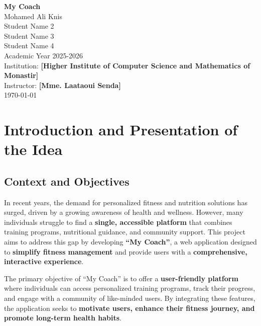 \documentclass[12pt,a4paper]{report}
\begin{document}
\begin{titlepage}
    \centering
    \vspace*{1cm}
    {\fontsize{20}{24}\selectfont \textbf{My Coach}} \\
    \vspace{1.5cm}
    {\large Mohamed Ali Knis \\ Student Name 2 \\ Student Name 3 \\ Student Name 4 \\} 
    \vspace{1cm}
    {\large Academic Year 2025-2026} \\
    \vfill
    {\large Institution: \textbf{[\Large Higher Institute of Computer Science and Mathematics of Monastir]}} \\
    \vspace*{0.5cm}
    {\large Instructor: \textbf{[Mme. Laataoui Senda]}} \\
    \vspace{0.8cm}
    \vspace{0.8cm}
    {\large \today}
\end{titlepage}
\tableofcontents
\newpage
\listoffigures
\newpage
\listoftables
\newpage
\newpage

\setcounter{page}{1}  

\chapter{Introduction and Presentation of the Idea}

\section{Context and Objectives}
In recent years, the demand for personalized fitness and nutrition solutions has surged, driven by a growing awareness of health and wellness. However, many individuals struggle to find a \textbf{single, accessible platform} that combines training programs, nutritional guidance, and community support. This project aims to address this gap by developing \textbf{``My Coach''}, a web application designed to \textbf{simplify fitness management} and provide users with a \textbf{comprehensive, interactive experience}.

The primary objective of ``My Coach'' is to offer a \textbf{user-friendly platform} where individuals can access personalized training programs, track their progress, and engage with a community of like-minded users. By integrating these features, the application seeks to \textbf{motivate users, enhance their fitness journey, and promote long-term health habits}.
\end{document}
